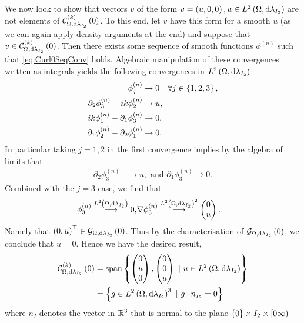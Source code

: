 We now look to show that vectors $v$ of the form $v=\left( u,0,0 \right), u\in L^{2}\left( \Omega,\mathrm{d}\lambda_{I_2} \right)$ are not elements of $\mathcal{C}_{ \Omega, \mathrm{d}\lambda_{I_2}}^{(k)}\left( 0 \right)$.
To this end, let $v$ have this form for a smooth $u$ (as we can again apply density arguments at the end) and suppose that $v\in\mathcal{C}_{ \Omega, \mathrm{d}\lambda_{I_2}}^{(k)}\left( 0 \right)$.
Then there exists some sequence of smooth functions $\phi^{(n)}$ such that \eqref{eq:Curl0SeqConv} holds.
Algebraic manipulation of these convergences written as integrals yields the following convergences in $L^{2}\left( \Omega,\mathrm{d}\lambda_{I_2} \right)$:
\begin{align*}
	\phi^{(n)}_j &\rightarrow 0 \quad \forall j\in\left\{ 1,2,3 \right\}, \\
	\partial_2\phi^{(n)}_3 - ik\phi^{(n)}_2 &\rightarrow u, \\
	ik\phi^{(n)}_1 - \partial_1\phi^{(n)}_3 &\rightarrow 0, \\
	\partial_1\phi^{(n)}_2 - \partial_2\phi^{(n)}_1 &\rightarrow 0.
\end{align*}
In particular taking $j=1,2$ in the first convergence implies by the algebra of limits that
\begin{align*}
	\partial_2\phi^{(n)}_3 &\rightarrow u, \text{ and } \partial_1\phi^{(n)}_3\rightarrow 0.
\end{align*}
Combined with the $j=3$ case, we find that
\begin{align*}
	\phi^{(n)}_3 \overset{L^{2}\left( \Omega,\mathrm{d}\lambda_{I_2} \right)}{\longrightarrow} 0,
	&\nabla\phi^{(n)}_3 \overset{L^{2}\left( \Omega,\mathrm{d}\lambda_{I_2} \right)^2}{\longrightarrow} \begin{pmatrix} 0 \\ u \end{pmatrix}.
\end{align*}
Namely that $\left( 0, u \right)^{\top}\in\mathcal{G}_{ \Omega, \mathrm{d}\lambda_{I_2}}\left( 0 \right)$.
Thus by the characterisation of $\mathcal{G}_{ \Omega, \mathrm{d}\lambda_{I_2}}\left( 0 \right)$, we conclude that $u=0$.
Hence we have the desired result,
\begin{align*}
	\kcurlZero{\ddom}{\lambda_{I_2}} &= \mathrm{span}\clbracs{\begin{pmatrix} 0 \\ u \\ 0 \end{pmatrix}, \begin{pmatrix} 0 \\ 0 \\ u \end{pmatrix} \ \vert \ u\in\ltwo{\ddom}{\lambda_{I_2}}} \\
	&= \clbracs{g\in\ltwo{\ddom}{\lambda_{I_2}}^3 \ \vert \ g\cdot n_{I_2} = 0}
\end{align*}
where $n_I$ denotes the vector in $\mathbb{R}^3$ that is normal to the plane $\left\{ 0 \right\}\times I_2\times[0\infty)$ 

